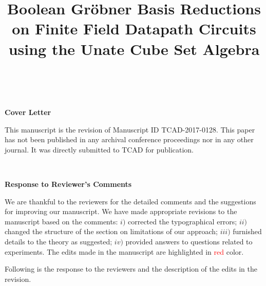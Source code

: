 \documentclass[conference, onecolumn]{IEEEtran}
\begin{document}



\title{\Large \sc 
Boolean Gr\"obner Basis Reductions on Finite Field Datapath Circuits using the Unate Cube Set Algebra
}

\author{


\ \\
}

\maketitle


 \begin{center}
{\bf \Large Cover Letter}
 \end{center}

This manuscript is the revision of Manuscript ID TCAD-2017-0128. This
paper has not been published in any archival conference proceedings
nor in any other journal. It was directly submitted to TCAD for
publication. 

\ \\

\begin{center}
{\bf \Large Response to Reviewer's Comments}
\end{center}
\vspace{0.1in}
We are thankful to the reviewers for the detailed comments and  
the suggestions for improving our manuscript. We have made 
appropriate revisions to the manuscript based on the comments:
$i)$ corrected the typographical errors; $ii)$ changed the structure 
of the section on limitations of our approach; $iii)$ furnished details to
the theory as suggested; $iv)$ provided answers to questions related to experiments.
The edits made in the manuscript are highlighted in
\textcolor{red}{red} color.

\par Following is the response to the reviewers and the description of
the edits in the revision. 
\end{document}
